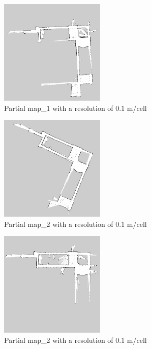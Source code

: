 \begin{figure}[H]
\begin{subfigure}{0.5\textwidth}
\includegraphics[width=0.9\linewidth, height=5cm]{figs/real_world_results/c/partial_map_1.jpg} 
\caption{Partial map\_1 with a resolution of 0.1 m/cell}
\label{fig:real21}
\end{subfigure}
\begin{subfigure}{0.5\textwidth}
\includegraphics[width=0.9\linewidth, height=5cm]{figs/real_world_results/c/partial_map_2.jpg} 
\caption{Partial map\_2 with a resolution of 0.1 m/cell}
\label{fig:real22}
\end{subfigure}
\begin{subfigure}{0.5\textwidth}
\includegraphics[width=0.9\linewidth, height=5cm]{figs/real_world_results/c/partial_map_3.jpg} 
\caption{Partial map\_2 with a resolution of 0.1 m/cell}
\label{fig:real23}
\end{subfigure}
\begin{subfigure}{0.5\textwidth}

\end{subfigure}
\end{figure}
